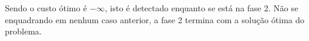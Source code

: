 \documentclass[
	12pt,				%
	openright,			%
	oneside,			%
	a4paper,			%
	english,			%
	french,				%
	spanish,			%
	brazil,				%
	]{abntex2}
\begin{document}
Sendo o custo ótimo é $-\infty$, isto é detectado enquanto se está na fase 2. Não se enquadrando em nenhum caso anterior, a fase 2 termina com a solução ótima do problema.
%
%
%
%
%
%
%

\postextual



%
%

\end{document}
